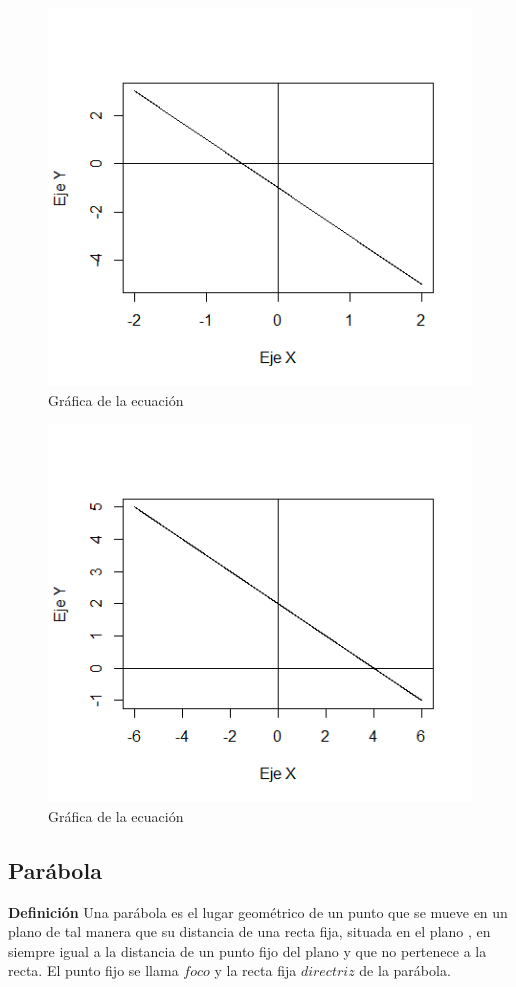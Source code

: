 \documentclass[12pt,a4paper]{article} %
\begin{document}
\begin{figure}[h]
\centering
\includegraphics[scale=1]{Recta1}
\caption{Gráfica de la ecuación }
\label{fig:LineaRecta}
\end{figure}

\begin{figure}[ht]
\centering
\includegraphics[scale=1]{Recta2}
\caption{Gráfica de la ecuación }
\label{fig:LineaRecta2}
\end{figure}

\newpage
\subsection{Parábola} \label{subsec:parabola}
\textbf{Definición} Una parábola es el lugar geométrico de un punto que se mueve en un plano de tal manera que su distancia de una recta fija, situada en el plano , en siempre igual a la distancia de un punto fijo del plano y que no pertenece a la recta.
El punto fijo se llama $foco$ y la recta fija $directriz$ de la parábola.
\end{document}

